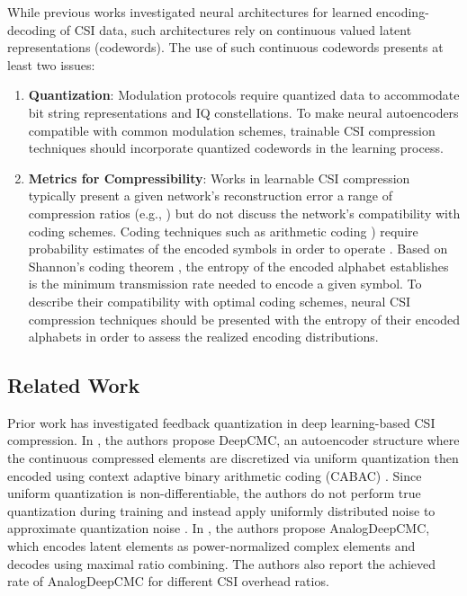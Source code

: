 


While previous works investigated neural architectures for learned encoding-decoding of CSI data, such architectures rely on continuous valued latent representations (codewords). The use of such continuous codewords presents at least two issues:
\begin{enumerate}
	\item \textbf{Quantization}: Modulation protocols require quantized data to accommodate bit string representations and IQ constellations. To make neural autoencoders compatible with common modulation schemes, trainable CSI compression techniques should incorporate quantized codewords in the learning process.
	\item \textbf{Metrics for Compressibility}: Works in learnable CSI compression typically present a given network's reconstruction error a range of compression ratios (e.g., \cite{ref:csinet,ref:dualnet}) but do not discuss the network's compatibility with coding schemes. Coding techniques such as arithmetic coding \cite{ref:Witten1987Arithmetic}) require probability estimates of the encoded symbols in order to operate \cite{ref:Howard1994Arithmetic}. Based on Shannon's coding theorem \cite{ref:Shannon1948Mathematical}, the entropy of the encoded alphabet establishes is the minimum transmission rate needed to encode a given symbol. To describe their compatibility with optimal coding schemes, neural CSI compression techniques should be presented with the entropy of their encoded alphabets in order to assess the realized encoding distributions.
\end{enumerate}

\subsection{Related Work}

Prior work has investigated feedback quantization in deep learning-based CSI compression. In \cite{ref:Yang2019DeepCMC}, the authors propose DeepCMC, an autoencoder structure where the continuous compressed elements are discretized via uniform quantization then encoded using context adaptive binary arithmetic coding (CABAC) \cite{ref:Marpe2003CABAC}. Since uniform quantization is non-differentiable, the authors do not perform true quantization during training and instead apply uniformly distributed noise to approximate quantization noise \cite{ref:Yang2019DeepCMC}. In \cite{ref:Mashhadi2020AnalogDeepCMC}, the authors propose AnalogDeepCMC, which encodes latent elements as power-normalized complex elements and decodes using maximal ratio combining. The authors also report the achieved rate of AnalogDeepCMC for different CSI overhead ratios.

